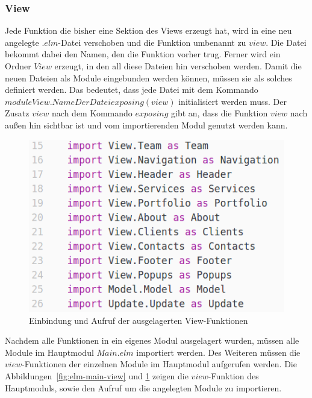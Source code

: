 \subsubsection{View}
\label{sec:auslagern-view}
Jede Funktion die bisher eine Sektion des Views erzeugt hat, wird in eine neu angelegte $.elm$-Datei verschoben und die Funktion umbenannt zu $view$. Die Datei bekommt dabei den Namen, den die Funktion vorher trug. Ferner wird ein Ordner $View$ erzeugt, in den all diese Dateien hin verschoben werden. Damit die neuen Dateien als Module eingebunden werden können, müssen sie als solches definiert werden. Das bedeutet, dass jede Datei mit dem Kommando $module View.NameDerDatei exposing (view)$ initialisiert werden muss. Der Zusatz $view$ nach dem Kommando $exposing$ gibt an, dass die Funktion $view$ nach außen hin sichtbar ist und vom importierenden Modul genutzt werden kann.
\begin{figure}[hbt]
\centering
\includegraphics[scale=0.5]{img/imports-main.png}
\caption{Einbindung und Aufruf der ausgelagerten View-Funktionen}\label{fig:elm-main-view-imports}
\end{figure}
Nachdem alle Funktionen in ein eigenes Modul ausgelagert wurden, müssen alle Module im Hauptmodul $Main.elm$ importiert werden. Des Weiteren müssen die $view$-Funktionen der einzelnen Module im Hauptmodul aufgerufen werden. Die Abbildungen~\ref{fig:elm-main-view} und \ref{fig:elm-main-view-imports} zeigen die $view$-Funktion des Hauptmoduls, sowie den Aufruf um die angelegten Module zu importieren.
